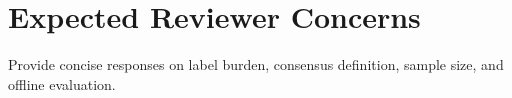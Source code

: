 \section{Expected Reviewer Concerns}
Provide concise responses on label burden, consensus definition, sample size, and offline evaluation.
